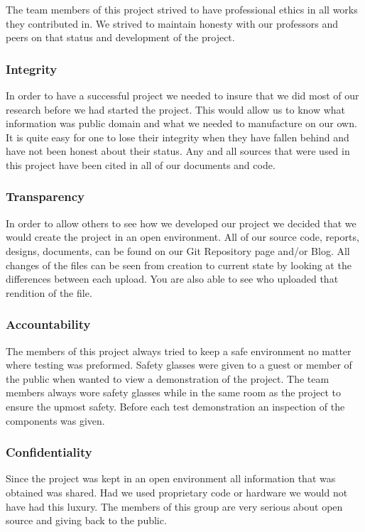 \documentclass{article}
\numberwithin{equation}{section} %
\begin{document}
The team members of this project strived to have professional ethics in all works they contributed in.  We strived to maintain honesty with our professors and peers on that status and development of the project. 
 
\subsubsection{Integrity}

In order to have a successful project we needed to insure that we did most of our research before we had started the project. This would allow us to know what information was public domain and what we needed to manufacture on our own. It is quite easy for one to lose their integrity when they have fallen behind and have not been honest about their status. Any and all sources that were used in this project have been cited in all of our documents and code.

\subsubsection{Transparency}

In order to allow others to see how we developed our project we decided that we would create the project in an open environment. All of our source code, reports, designs, documents, can be found on our Git Repository page and/or Blog. All changes of the files can be seen from creation to current state by looking at the differences between each upload. You are also able to see who uploaded that rendition of the file.

\subsubsection{Accountability}

The members of this project always tried to keep a safe environment no matter where testing was preformed. Safety glasses were given to a guest or member of the public when wanted to view a demonstration of the project. The team members always wore safety glasses while in the same room as the project to ensure the upmost safety. Before each test demonstration an inspection of the components was given.

\subsubsection{Confidentiality}

Since the project was kept in an open environment all information that was obtained was shared. Had we used proprietary code or hardware we would not have had this luxury. The members of this group 
are very serious about open source and giving back to the public.
\end{document}
